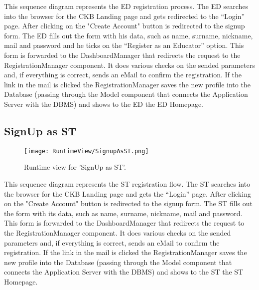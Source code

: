 This sequence diagram represents the ED registration process.
The ED searches into the browser for the CKB Landing page and gets redirected to the “Login” page. After clicking on the "Create Account" button is redirected to the signup form. The ED fills out the form with his data, such as name, surname, nickname, mail and password and he ticks on the “Register as an Educator” option.
This form is forwarded to the DashboardManager that redirects the request to the RegistrationManager component. It does various checks on the sended parameters and, if everything is correct, sends an eMail to confirm  the registration. If the link in the mail is clicked the RegistrationManager saves the new profile into the Database (passing through the Model component that connects the Application Server with the DBMS) and shows to the ED the ED Homepage.


\subsection{SignUp as ST}
\begin{figure}[H]
    \begin{center}
        \texttt{[image: RuntimeView/SignupAsST.png]}
        \caption{Runtime view for 'SignUp as ST'.}
        \label{fig:runtime_signupasST}%
    \end{center}
\end{figure}

This sequence diagram represents the ST registration flow.
The ST searches into the browser for the CKB Landing page and gets the “Login” page.
After clicking on the "Create Account" button is redirected to the signup form.
The ST fills out the form with its data, such as name, surname, nickname, mail and password. 
This form is forwarded to the DashboardManager that redirects the request to the RegistrationManager component. It does various checks on the sended parameters and, if everything is correct, sends an eMail to confirm the registration.
If the link in the mail is clicked the RegistrationManager saves the new profile into the Database (passing through the Model component that connects the Application Server with the DBMS) and shows to the ST the ST Homepage.

